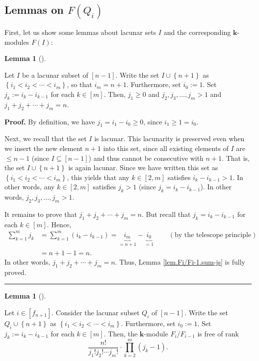 \documentclass[numbers=enddot,12pt,final,onecolumn,notitlepage]{scrartcl}%
\theoremstyle{definition}
\newtheorem{lem}[theo]{Lemma}
\newenvironment{lemma}[1][]
{\begin{lem}[#1]\begin{leftbar}}
{\end{leftbar}\end{lem}}
\newenvironment{proof}[1][Proof]{\noindent\textbf{#1.} }{\ \rule{0.5em}{0.5em}}
\let\sumnonlimits\sum
\let\prodnonlimits\prod
\renewcommand{\sum}{\sumnonlimits\limits}
\renewcommand{\prod}{\prodnonlimits\limits}
\begin{document}
\subsection{Lemmas on $F\left(  Q_{i}\right)  $}

First, let us show some lemmas about lacunar sets $I$ and the corresponding
$\mathbf{k}$-modules $F\left(  I\right)  $:

\begin{lemma}
\label{lem.Fi/Fi-1.sum-js}Let $I$ be a lacunar subset of $\left[  n-1\right]
$. Write the set $I\cup\left\{  n+1\right\}  $ as $\left\{  i_{1}<i_{2}%
<\cdots<i_{m}\right\}  $, so that $i_{m}=n+1$. Furthermore, set $i_{0}:=1$.
Set $j_{k}:=i_{k}-i_{k-1}$ for each $k\in\left[  m\right]  $. Then, $j_{1}%
\geq0$ and $j_{2},j_{3},\ldots,j_{m}>1$ and $j_{1}+j_{2}+\cdots+j_{m}=n$.
\end{lemma}

\begin{proof}
By definition, we have $j_{1}=i_{1}-i_{0}\geq0$, since $i_{1}\geq1=i_{0}$.

Next, we recall that the set $I$ is lacunar. This lacunarity is preserved even
when we insert the new element $n+1$ into this set, since all existing
elements of $I$ are $\leq n-1$ (since $I\subseteq\left[  n-1\right]  $) and
thus cannot be consecutive with $n+1$. That is, the set $I\cup\left\{
n+1\right\}  $ is again lacunar. Since we have written this set as $\left\{
i_{1}<i_{2}<\cdots<i_{m}\right\}  $, this yields that any $k\in\left[
2,m\right]  $ satisfies $i_{k}-i_{k-1}>1$. In other words, any $k\in\left[
2,m\right]  $ satisfies $j_{k}>1$ (since $j_{k}=i_{k}-i_{k-1}$). In other
words, $j_{2},j_{3},\ldots,j_{m}>1$.

It remains to prove that $j_{1}+j_{2}+\cdots+j_{m}=n$. But recall that
$j_{k}=i_{k}-i_{k-1}$ for each $k\in\left[  m\right]  $. Hence,%
\begin{align*}
\sum_{k=1}^{m}j_{k}  &  =\sum_{k=1}^{m}\left(  i_{k}-i_{k-1}\right)
=\underbrace{i_{m}}_{=n+1}-\underbrace{i_{0}}_{=1}\ \ \ \ \ \ \ \ \ \ \left(
\text{by the telescope principle}\right) \\
&  =n+1-1=n.
\end{align*}
In other words, $j_{1}+j_{2}+\cdots+j_{m}=n$. Thus, Lemma
\ref{lem.Fi/Fi-1.sum-js} is fully proved.
\end{proof}

\begin{lemma}
\label{lem.Fi/Fi-1.dim}Let $i\in\left[  f_{n+1}\right]  $. Consider the
lacunar subset $Q_{i}$ of $\left[  n-1\right]  $. Write the set $Q_{i}%
\cup\left\{  n+1\right\}  $ as $\left\{  i_{1}<i_{2}<\cdots<i_{m}\right\}  $.
Furthermore, set $i_{0}:=1$. Set $j_{k}:=i_{k}-i_{k-1}$ for each $k\in\left[
m\right]  $. Then, the $\mathbf{k}$-module $F_{i}/F_{i-1}$ is free of rank%
\[
\dfrac{n!}{j_{1}!j_{2}!\cdots j_{m}!}\cdot\prod_{k=2}^{m}\left(
j_{k}-1\right)  .
\]

\end{lemma}
\end{document}
